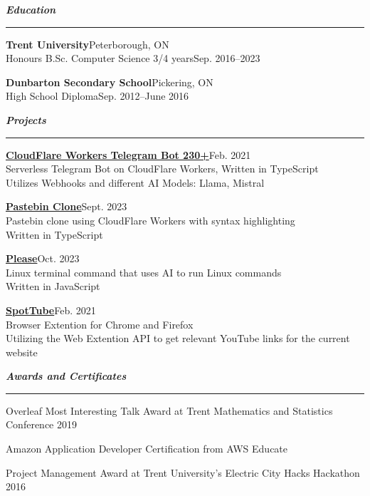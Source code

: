 \documentclass[letterpaper,11pt]{article}
\newcommand{\mysection}[1]{\vspace{5pt} {\bfseries \textsl{#1}} \\ {\color{gray} \rule[5pt]{\textwidth}{1pt}}}
\begin{document}
\mysection{Education}
\begin{description}
    \item \textbf{Trent University}\hfill Peterborough, ON\\
        Honours B.Sc. Computer Science 3/4 years\hfill Sep. 2016–2023
    \item \textbf{Dunbarton Secondary School}\hfill Pickering, ON\\
        High School Diploma\hfill Sep. 2012–June 2016
\end{description}

\mysection{Projects}
\begin{description}
    \item
         \href{https://github.com/codebam/cf-workers-telegram-bot}{\textbf{CloudFlare Workers Telegram Bot  230+}}\hfill Feb. 2021\\
        Serverless Telegram Bot on CloudFlare Workers, Written in TypeScript\\
        Utilizes Webhooks and different AI Models: Llama, Mistral\\
    \item {} \href{https://github.com/codebam/pastebin-r2}{\textbf{Pastebin Clone}}\hfill Sept. 2023\\
        Pastebin clone using CloudFlare Workers with syntax highlighting\\
        Written in TypeScript\\
    \item {} \href{https://github.com/codebam/please}{\textbf{Please}}\hfill Oct. 2023\\
        Linux terminal command that uses AI to run Linux commands\\
        Written in JavaScript\\
    \item {} \href{https://github.com/codebam/spottube}{\textbf{SpotTube}}\hfill Feb. 2021\\
        Browser Extention for Chrome and Firefox\\
        Utilizing the Web Extention API to get relevant YouTube links for the current website\\
\end{description}

\mysection{Awards and Certificates}
\begin{description}
    \item {} Overleaf Most Interesting Talk Award at Trent Mathematics and Statistics Conference 2019
    \item {} Amazon Application Developer Certification from AWS Educate
    \item {} Project Management Award at Trent University's Electric City Hacks Hackathon 2016
\end{description}
\end{document}
